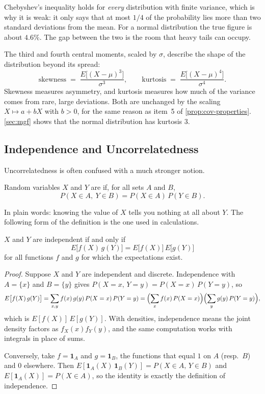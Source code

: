 Chebyshev's inequality holds for \emph{every} distribution with finite variance, which is why it is weak: it only says that at most $1/4$ of the probability lies more than two standard deviations from the mean.
For a normal distribution the true figure is about $4.6\%$.
The gap between the two is the room that heavy tails can occupy.

The third and fourth central moments, scaled by $\sigma$, describe the shape of the distribution beyond its spread:
\[
	\text{skewness} \;=\; \frac{E\bigl[(X-\mu)^{3}\bigr]}{\sigma^{3}} ,
	\qquad
	\text{kurtosis} \;=\; \frac{E\bigl[(X-\mu)^{4}\bigr]}{\sigma^{4}} .
\]
Skewness measures asymmetry, and kurtosis measures how much of the variance comes from rare, large deviations.
Both are unchanged by the scaling $X\mapsto a+bX$ with $b>0$, for the same reason as item~5 of \autoref{prop:cov-properties}.
\autoref{sec:mgf} shows that the normal distribution has kurtosis $3$.

\subsection{Independence and Uncorrelatedness}
\label{subsec:independence}

Uncorrelatedness is often confused with a much stronger notion.

\begin{definition}
	Random variables $X$ and $Y$ are  if, for all sets $A$ and $B$,
	\[
		P(X\in A,\ Y\in B) = P(X\in A)\,P(Y\in B) .
	\]
\end{definition}

In plain words: knowing the value of $X$ tells you nothing at all about $Y$.
The following form of the definition is the one used in calculations.

\begin{proposition}\label{prop:indep-factor}
	$X$ and $Y$ are independent if and only if
	\[
		E\bigl[f(X)\,g(Y)\bigr] = E\bigl[f(X)\bigr]\,E\bigl[g(Y)\bigr]
	\]
	for all functions $f$ and $g$ for which the expectations exist.
\end{proposition}

\begin{proof}
	Suppose $X$ and $Y$ are independent and discrete.
	Independence with $A=\{x\}$ and $B=\{y\}$ gives $P(X=x,\,Y=y)=P(X=x)\,P(Y=y)$, so
	\[
		E\bigl[f(X)\,g(Y)\bigr]
		= \sum_{x,y} f(x)\,g(y)\,P(X=x)\,P(Y=y)
		= \Bigl(\sum_{x} f(x)\,P(X=x)\Bigr)\Bigl(\sum_{y} g(y)\,P(Y=y)\Bigr) ,
	\]
	which is $E[f(X)]\,E[g(Y)]$.
	With densities, independence means the joint density factors as $f_{X}(x)f_{Y}(y)$, and the same computation works with integrals in place of sums.

	Conversely, take $f=\mathbf{1}_{A}$ and $g=\mathbf{1}_{B}$, the functions that equal $1$ on $A$ (resp.\ $B$) and $0$ elsewhere.
	Then $E[\mathbf{1}_{A}(X)\,\mathbf{1}_{B}(Y)]=P(X\in A,\,Y\in B)$ and $E[\mathbf{1}_{A}(X)]=P(X\in A)$, so the identity is exactly the definition of independence.
\end{proof}

